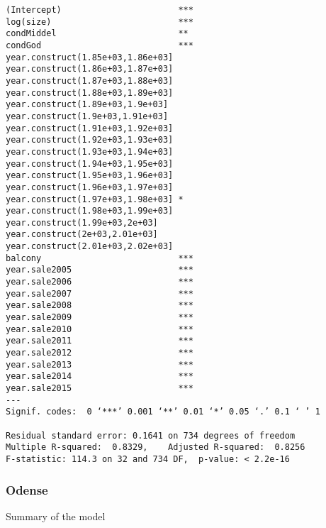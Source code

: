 \begin{lstlisting}
(Intercept)                       ***
log(size)                         ***
condMiddel                        ** 
condGod                           ***
year.construct(1.85e+03,1.86e+03]    
year.construct(1.86e+03,1.87e+03]    
year.construct(1.87e+03,1.88e+03]    
year.construct(1.88e+03,1.89e+03]    
year.construct(1.89e+03,1.9e+03]     
year.construct(1.9e+03,1.91e+03]     
year.construct(1.91e+03,1.92e+03]    
year.construct(1.92e+03,1.93e+03]    
year.construct(1.93e+03,1.94e+03]    
year.construct(1.94e+03,1.95e+03]    
year.construct(1.95e+03,1.96e+03]    
year.construct(1.96e+03,1.97e+03]    
year.construct(1.97e+03,1.98e+03] *  
year.construct(1.98e+03,1.99e+03]    
year.construct(1.99e+03,2e+03]       
year.construct(2e+03,2.01e+03]       
year.construct(2.01e+03,2.02e+03]    
balcony                           ***
year.sale2005                     ***
year.sale2006                     ***
year.sale2007                     ***
year.sale2008                     ***
year.sale2009                     ***
year.sale2010                     ***
year.sale2011                     ***
year.sale2012                     ***
year.sale2013                     ***
year.sale2014                     ***
year.sale2015                     ***
---
Signif. codes:  0 ‘***’ 0.001 ‘**’ 0.01 ‘*’ 0.05 ‘.’ 0.1 ‘ ’ 1

Residual standard error: 0.1641 on 734 degrees of freedom
Multiple R-squared:  0.8329,	Adjusted R-squared:  0.8256 
F-statistic: 114.3 on 32 and 734 DF,  p-value: < 2.2e-16
\end{lstlisting}


\subsubsection{Odense}
Summary of the model

